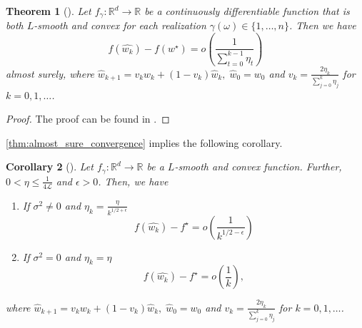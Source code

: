 \documentclass[12pt]{article}
\newtheorem{theorem}{Theorem}[section]
\newtheorem{corollary}[theorem]{Corollary}
\theoremstyle{definition}
\newtheorem{assumption}[assumption]{Assumption}
\numberwithin{equation}{section}
\newcommand{\R}{\mathbb{R}}
\newcommand{\CL}{\mathcal{L}}
\begin{document}
\begin{theorem}[]
  \label{thm:almost_sure_convergence}
  Let $f_{\gamma} : \R^d \rightarrow \R$ be a continuously differentiable function that is both $L$-smooth and convex for each realization $\gamma(\omega) \in \{1,\dots,n\}$. Then we have 
  \begin{equation*}
    f(\widehat{w_{k}}) - f(w^\star) = o\left(\frac{1}{\sum_{t=0}^{k-1}\eta_t}\right)
  \end{equation*}
  almost surely, where $\widehat{w}_{k+1} = v_k w_k + (1-v_k)\widehat{w}_k, \; \widehat{w}_0 = w_0$ and $v_k = \frac{2\eta_k}{\sum_{j=0}^k\eta_j}$ for $k=0,1,\dots$.
\end{theorem}
\begin{proof}
  The proof can be found in \autocite{sebbouhAlmostSureConvergence2021}.
\end{proof}
\autoref{thm:almost_sure_convergence} implies the following corollary.
\begin{corollary}[]
  Let $f_{\gamma}: \R^d \rightarrow \R$ be a $L$-smooth and convex function. Further, $0 < \eta \leq \frac{1}{4\CL}$ and $\epsilon > 0 $. Then, we have
  \begin{enumerate}
    \item If $\sigma^2 \neq 0$ and $\eta_k = \frac{\eta}{k^{1/2+\epsilon}}$
    \begin{equation*}
      f(\widehat{w_{k}}) - f^\star = o\left(\frac{1}{k^{1/2-\epsilon}}\right)
    \end{equation*}
    \item If $\sigma^2 = 0$ and $\eta_k = \eta$
    \begin{equation*}
      f(\widehat{w_{k}}) - f^\star = o\left(\frac{1}{k}\right),
    \end{equation*}
  \end{enumerate}
  where $\widehat{w}_{k+1} = v_k w_k + (1-v_k)\widehat{w}_k, \; \widehat{w}_0 = w_0$ and $v_k = \frac{2\eta_k}{\sum_{j=0}^k\eta_j}$ for $k=0,1,\dots$.
\end{corollary}
\end{document}
